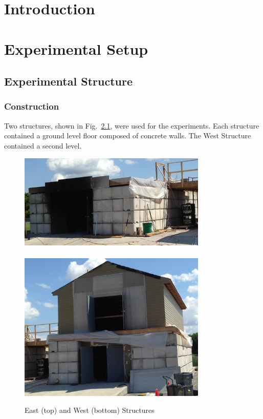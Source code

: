 \documentclass[12pt,oneside]{book}
\begin{document}
\mainmatter

\chapter{Introduction}
\label{chap:Introduction}

\chapter{Experimental Setup}
\label{chap:Experimental_Setup}

\section{Experimental Structure}
\label{sec:Experimental_Structure}

\subsection{Construction}
\label{sec:Construction}
Two structures, shown in Fig.~\ref{fig:struct_pics}, were used for the experiments. Each structure contained a ground level floor composed of concrete walls. The West Structure contained a second level.

\begin{figure}[!ht]
\includegraphics[width=0.80\textwidth]{../Pictures/east_structure}
\\~\\
\includegraphics[width=0.80\textwidth]{../Pictures/west_structure}
\caption{East (top) and West (bottom) Structures}
\label{fig:struct_pics}
\end{figure}
\end{document}
